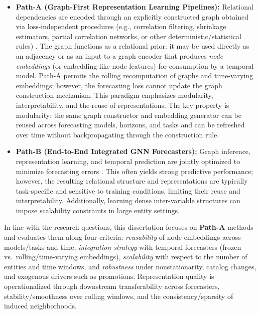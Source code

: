 \begin{itemize}
    \item \textbf{Path-A (Graph-First Representation Learning Pipelines):}
    Relational dependencies are encoded through an explicitly constructed graph obtained via loss-independent procedures (e.g., correlation filtering, shrinkage estimators, partial correlation networks, or other deterministic/statistical rules) \cite{friedman2008glasso,ledoit2004wellconditioned,tumminello2005pmfg,massara2016tmfg}. The graph functions as a relational prior: it may be used directly as an adjacency or as an input to a graph encoder that produces \emph{node embeddings} (or embedding-like node features) for consumption by a temporal model. Path-A permits the rolling recomputation of graphs and time-varying embeddings; however, the forecasting loss cannot update the graph construction mechanism. This paradigm emphasizes modularity, interpretability, and the reuse of representations. The key property is modularity: the same graph constructor and embedding generator can be reused across forecasting models, horizons, and tasks and can be refreshed over time without backpropagating through the construction rule.
    

    \item \textbf{Path-B (End-to-End Integrated GNN Forecasters):}
    Graph inference, representation learning, and temporal prediction are jointly optimized to minimize forecasting errors \cite{wu2019graphwavenetdeepspatialtemporal,wu2020connectingdotsmultivariatetime,bai2020adaptivegraphconvolutionalrecurrent}. This often yields strong predictive performance; however, the resulting relational structure and representations are typically task-specific and sensitive to training conditions, limiting their reuse and interpretability. Additionally, learning dense inter-variable structures can impose scalability constraints in large entity settings.
\end{itemize}

In line with the research questions, this dissertation focuses on \textbf{Path-A} methods and evaluates them along four criteria: \emph{reusability} of node embeddings across models/tasks and time, \emph{integration strategy} with temporal forecasters (frozen vs.\ rolling/time-varying embeddings), \emph{scalability} with respect to the number of entities and time windows, and \emph{robustness} under nonstationarity, catalog changes, and exogenous drivers such as promotions. Representation quality is operationalized through downstream transferability across forecasters, stability/smoothness over rolling windows, and the consistency/sparsity of induced neighborhoods.

